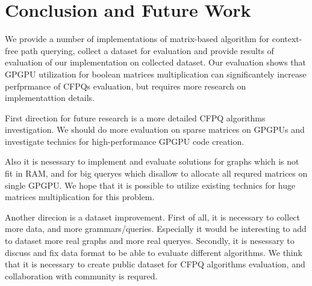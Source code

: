 \section{Conclusion and Future Work}

We provide a number of implementations of matrix-based algorithm for context-free path querying, collect a dataset for evaluation and provide results of evaluation of our implementation on collected dataset.
Our evaluation shows that GPGPU utilization for boolean matrices multiplication can significantely increase perfprmance of CFPQs evaluation, but requires more research on implementattion details.

First direction for future research is a more detailed CFPQ algorithms investigation.
We should do more evaluation on sparse matrices on GPGPUs and investigate technics for high-performance GPGPU code creation.

Also it is nesessary to implement and evaluate solutions for graphs which is not fit in RAM, and for big queryes which disallow to allocate all requred matrices on single GPGPU.
We hope that it is possible to utilize existing technics for huge matrices multiplication for this problem.

Another direcion is a dataset improvement.
First of all, it is necessary to collect more data, and more grammars/queries.
Especially it would be interesting to add to dataset more real graphs and more real queryes.
Secondly, it is nesessary to discuss and fix data format to be able to evaluate different algorithms.
We think that it is necessary to create public dataset for CFPQ algorithms evaluation, and collaboration with community is requred.


